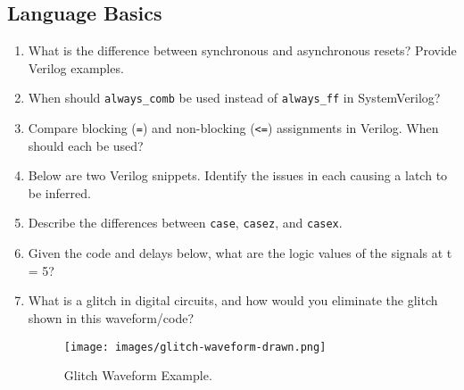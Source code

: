 \documentclass[11pt]{article}
\begin{document}
\subsection{Language Basics}
\begin{enumerate}
    \item What is the difference between synchronous and asynchronous resets?
    Provide Verilog examples.

    \item When should \texttt{always\_comb} be used instead of
    \texttt{always\_ff} in SystemVerilog?

    \item Compare blocking (\verb|=|) and non-blocking (\verb|<=|) assignments
    in Verilog. When should each be used?

    \item Below are two Verilog snippets. Identify the issues in each causing a
    latch to be inferred.
    

    \item Describe the differences between \texttt{case}, \texttt{casez}, and
    \texttt{casex}.

    \item Given the code and delays below, what are the logic
    values of the signals at t = 5?
    



    \item What is a glitch in digital circuits, and how would you eliminate the
    glitch shown in this waveform/code?
    
    

    \begin{figure}[H]
        \centering
        \texttt{[image: images/glitch-waveform-drawn.png]}
        \caption{Glitch Waveform Example.}
        \label{fig:glitch_waveform}
    \end{figure}


\end{enumerate}
\end{document}
